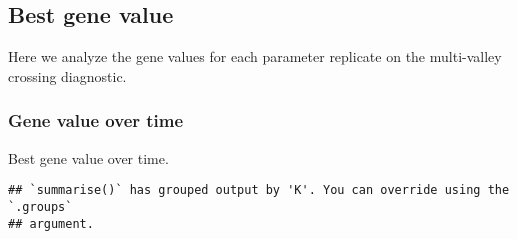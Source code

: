 \documentclass[]{book}
\newenvironment{Shaded}{\begin{snugshade}}{\end{snugshade}}
\newcommand{\DataTypeTok}[1]{\textcolor[rgb]{0.13,0.29,0.53}{#1}}
\newcommand{\KeywordTok}[1]{\textcolor[rgb]{0.13,0.29,0.53}{\textbf{#1}}}
\newcommand{\NormalTok}[1]{#1}
\newcommand{\OperatorTok}[1]{\textcolor[rgb]{0.81,0.36,0.00}{\textbf{#1}}}
\newcommand{\StringTok}[1]{\textcolor[rgb]{0.31,0.60,0.02}{#1}}
\begin{document}
\hypertarget{best-gene-value-6}{%
\subsection{Best gene value}\label{best-gene-value-6}}

Here we analyze the gene values for each parameter replicate on the multi-valley crossing diagnostic.

\hypertarget{gene-value-over-time-5}{%
\subsubsection{Gene value over time}\label{gene-value-over-time-5}}

Best gene value over time.

\begin{Shaded}
\end{Shaded}

\begin{verbatim}
## `summarise()` has grouped output by 'K'. You can override using the `.groups`
## argument.
\end{verbatim}
\end{document}
